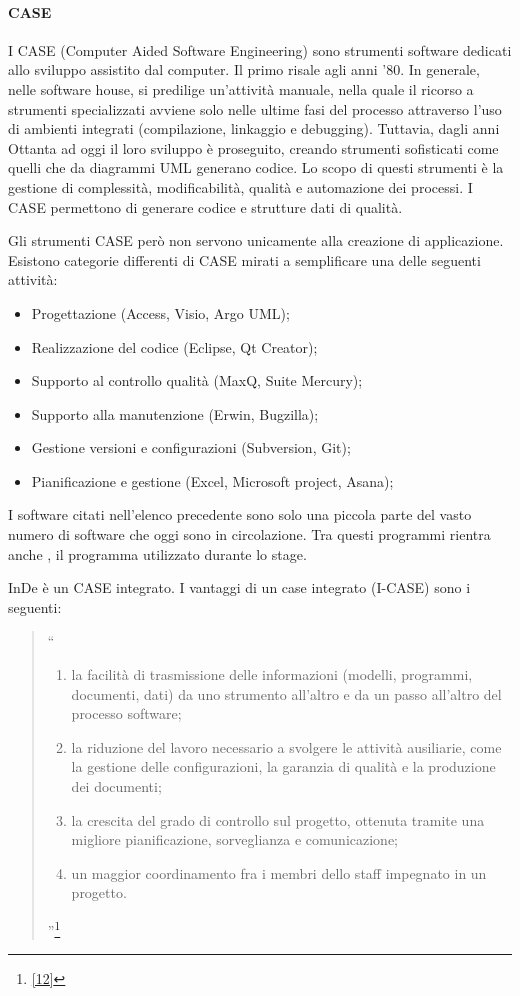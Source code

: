 \paragraph{CASE}\label{CASE}
I CASE (Computer Aided Software Engineering) sono strumenti software dedicati allo sviluppo assistito dal computer. Il primo risale agli anni '80. In generale, nelle software house, si predilige un'attività manuale, nella quale il ricorso a strumenti specializzati avviene solo nelle ultime fasi del processo attraverso l'uso di ambienti integrati (compilazione, linkaggio e debugging).
Tuttavia, dagli anni Ottanta ad oggi il loro sviluppo è proseguito, creando strumenti sofisticati come quelli che da diagrammi UML generano codice.
Lo scopo di questi strumenti è la gestione di complessità, modificabilità, qualità e automazione dei processi. I CASE permettono di generare codice e strutture dati di qualità. 

Gli strumenti CASE però non servono unicamente alla creazione di applicazione. Esistono categorie differenti di CASE mirati a semplificare una delle seguenti attività:
\begin{itemize}
	\item Progettazione (Access, Visio, Argo UML);
	\item Realizzazione del codice (Eclipse, Qt Creator);
	\item Supporto al controllo qualità (MaxQ, Suite Mercury);
	\item Supporto alla manutenzione (Erwin, Bugzilla);
	\item Gestione versioni e configurazioni (Subversion, Git);
	\item Pianificazione e gestione (Excel, Microsoft project, Asana);
\end{itemize}
I software citati nell'elenco precedente sono solo una piccola parte del vasto numero di software che oggi sono in circolazione. Tra questi programmi rientra anche \inde, il programma utilizzato durante lo stage. 

InDe è un CASE integrato. I vantaggi di un case integrato (I-CASE) sono i seguenti:

\begin{quote}
	``	
	\begin{enumerate}
		\item la facilità di trasmissione delle informazioni (modelli, programmi, documenti, dati) da uno strumento all'altro e da un passo all'altro del processo software; 
		\item la riduzione del lavoro necessario a svolgere le attività ausiliarie, come la gestione delle configurazioni, la garanzia di qualità e la produzione dei documenti; 
		\item la crescita del grado di controllo sul pro­getto, ottenuta tramite una migliore pianificazione, sorveglianza e comunicazione; 
		\item un maggior coordinamento fra i membri dello staff impegnato in un progetto.
	\end{enumerate}
		''\footnote[4]{\hyperref[bib12]{[12]}}
\end{quote}


